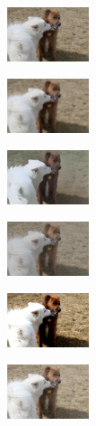 \begin{figure}[ht]
	\centering
	\captionsetup[subfigure]{labelformat=empty}
		\begin{subfigure}[b]{0.1\textwidth}
		\centering
		\includegraphics[width=2.4cm]{orig - filter.jpeg}
		
		\end{subfigure}
		\hfill
		\begin{subfigure}[b]{0.1\textwidth}
			\includegraphics[width=2.4cm]{orig - filter - blur.jpeg}
			
		\end{subfigure}
		\hfill
		\begin{subfigure}[b]{0.1\textwidth}
			\includegraphics[width=2.4cm]{orig - filter - cartoon.jpeg}
			
		\end{subfigure}
		\hfill
		\begin{subfigure}[b]{0.1\textwidth}
			\includegraphics[width=2.4cm]{orig - filter - man contr (2).jpg}
			
		\end{subfigure}
		\hfill
		\begin{subfigure}[b]{0.1\textwidth}
			\includegraphics[width=2.4cm]{orig - filter - man contr (1).jpg}
			
		\end{subfigure}
		\hfill
		\begin{subfigure}[b]{0.1\textwidth}
			\includegraphics[width=2.4cm]{orig - filter - lumin (1).jpeg}
			

\end{subfigure}
\end{figure}
